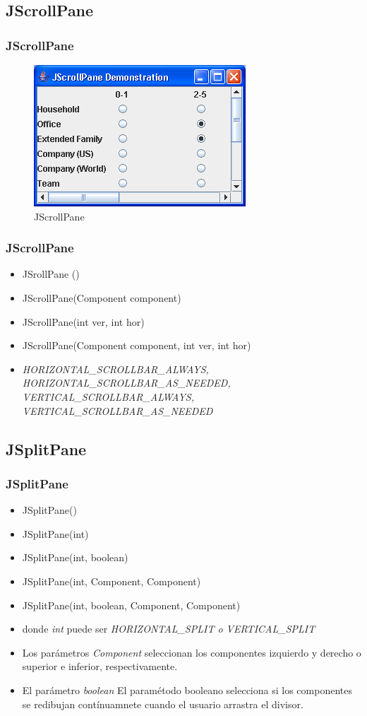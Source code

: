 \documentclass{beamer}
\begin{document}
\subsection{JScrollPane}
\begin{frame}
\frametitle{JScrollPane}
\begin{figure}
\includegraphics[scale=0.7]{imagenes/jpanels.PNG}
\caption{JScrollPane}
\end{figure}
\end{frame}

\begin{frame}
\frametitle{JScrollPane}
\begin{itemize}[<+->]
\item JSrollPane ()
\item JScrollPane(Component component)
\item JScrollPane(int ver, int hor)
\item JScrollPane(Component component, int ver, int hor)
\item  \emph{HORIZONTAL\_SCROLLBAR\_ALWAYS, HORIZONTAL\_SCROLLBAR\_AS\_NEEDED, VERTICAL\_SCROLLBAR\_ALWAYS, VERTICAL\_SCROLLBAR\_AS\_NEEDED}
\end{itemize}
\end{frame}


\subsection{JSplitPane}
\begin{frame}
\frametitle{JSplitPane}
\begin{itemize}[<+->]
\item JSplitPane()
\item JSplitPane(int)
\item JSplitPane(int, boolean)
\item JSplitPane(int, Component, Component)
\item JSplitPane(int, boolean, Component, Component)
\item donde \emph{int} puede ser \emph{HORIZONTAL\_SPLIT o VERTICAL\_SPLIT}
\item  Los parámetros \emph{Component} seleccionan los componentes izquierdo y derecho o superior e inferior, respectivamente. 
\item El parámetro \emph{boolean} El paramétodo booleano selecciona si los componentes se redibujan contínuamnete cuando el usuario arrastra el divisor.
\end{itemize}
\end{frame}
\end{document}
